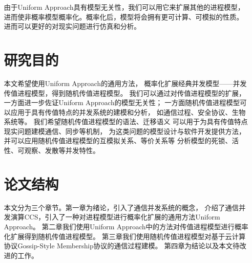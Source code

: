    由于Uniform Approach具有模型无关性，我们可以用它来扩展其他的进程模型，
   进而使非概率模型概率化。概率化后，模型将会拥有更可计算、可模拟的性质。
   进而可以更好的对现实问题进行仿真和分析。

\section{研究目的}
本文希望使用Uniform Approach的通用方法，
概率化扩展经典并发模型——并发传值进程模型，得到随机传值进程模型。
我们可以通过对传值进程模型的扩展，
一方面进一步佐证Uniform Approach的模型无关性；
一方面随机传值进程模型可以应用于具有传值特点的并发系统的建模和分析，
如通信过程、安全协议、生物系统等。
我们希望随机传值进程模型的语法、迁移语义
可以用于为具有传值特点现实问题建模通信、同步等机制，
为这类问题的模型设计与软件开发提供方法，
并可以应用随机传值进程模型的互模拟关系、等价关系等
分析模型的死锁、活性、可观察、发散等并发特性。

\section{论文结构}
本文分为三个章节。第一章为绪论，引入了通信并发系统的概念，
介绍了通信并发演算CCS，引入了一种对进程模型进行概率化扩展的通用方法Uniform Approach。
第二章我们使用Uniform Approach中的方法对传值进程模型进行概率化扩展得到随机传值进程模型。
第三章我们使用随机传值进程模型对基于云计算协议Gossip-Style Membership协议的通信过程建模。
第四章为结论以及本文待改进的工作。
